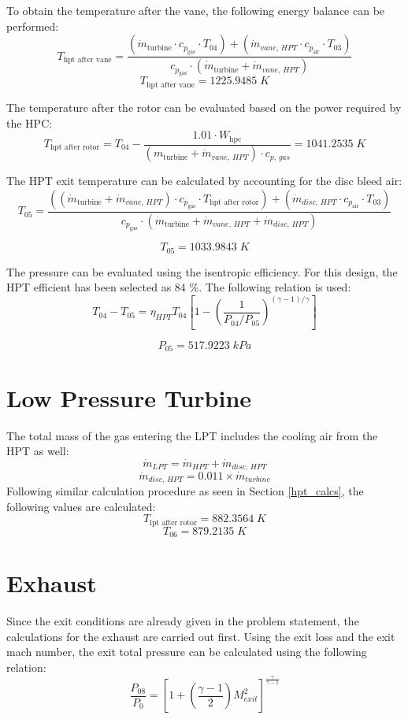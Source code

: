 To obtain the temperature after the vane, the following energy balance can be performed:
$$T_{\text{hpt after vane}} = \frac{{(\dot{m}_{\text{turbine}} \cdot c_{p_{\text{gas}}} \cdot T_{04}) + (\dot{m}_{vane,\, HPT} \cdot c_{p_{\text{air}}} \cdot T_{03})}}{{c_{p_{\text{gas}}} \cdot (\dot{m}_{\text{turbine}} + \dot{m}_{vane,\, HPT})}}$$
$$T_{\text{hpt after vane}} =  1225.9485\; K$$

The temperature after the rotor can be evaluated based on the power required by the HPC:
$$T_{\text{hpt after rotor}} = T_{04} - \frac{{1.01 \cdot W_{\text{hpc}}}}{{(m_{\text{turbine}} + \dot{m}_{vane,\, HPT}) \cdot c_{p,\,gas}}} = 1041.2535\; K$$

The HPT exit temperature can be calculated by accounting for the disc bleed air:
$$T_{05} = \frac{{((\dot{m}_{\text{turbine}} + \dot{m}_{vane,\, HPT}) \cdot c_{p_{\text{gas}}} \cdot T_{\text{hpt after rotor}}) + 
(\dot{m}_{disc,\, HPT} \cdot c_{p_{\text{air}}} \cdot T_{03})}}{{c_{p_{\text{gas}}} \cdot (\dot{m}_{\text{turbine}} + \dot{m}_{vane,\, HPT} + 
\dot{m}_{disc,\, HPT})}}
$$


$$T_{05} = 1033.9843\; K$$

The pressure can be evaluated using the isentropic efficiency. For this design, the HPT efficient has been selected as 84 \%. The following relation is used:
\begin{equation} \label{eq:pressure_eq}
  T_{04} - T_{05} = \eta_{HPT} T_{04} \left[ 1 - \left(  \frac{1}{P_{04}/P_{05}} \right) ^{(\gamma - 1)/\gamma}\right]
\end{equation}

$$P_{05} = 517.9223\; kPa$$

\section{Low Pressure Turbine}
The total mass of the gas entering the LPT includes the cooling air from the HPT as well:
$$\dot{m}_{LPT} = \dot{m}_{HPT} + \dot{m}_{disc,\, HPT}$$
$$\dot{m}_{disc,\, HPT} = 0.011 \times \dot{m}_{turbine}$$
Following similar calculation procedure as seen in Section \ref{hpt_calcs}, the following values are calculated:
$$T_{\text{lpt after rotor}} = 882.3564 \; K$$
$$T_{06} = 879.2135 \; K$$

\section{Exhaust}
Since the exit conditions are already given in the problem statement, the calculations for the exhaust are carried out first.
Using the exit loss and the exit mach number, the exit total pressure can be calculated using the following relation:
\begin{equation}
  \frac{P_{08}}{P_0} = \left[  1 + \left(  \frac{\gamma - 1}{2} \right) M_{exit}^2  \right]^{\frac{\gamma}{\gamma-1}}   
\end{equation}

